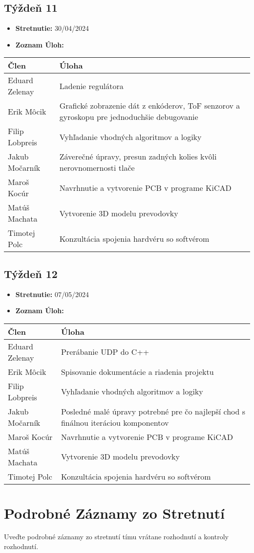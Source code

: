 \subsection{Týždeň 11}
\begin{itemize}
    \item \textbf{Stretnutie:} 30/04/2024
    \item \textbf{Zoznam Úloh:}
\end{itemize}

\begin{tabular}{|l|l|}
    \hline
    \textbf{Člen} & \textbf{Úloha} \\
    \hline
    Eduard Zelenay & Ladenie regulátora \\
    Erik Môcik & Grafické zobrazenie dát z enkóderov, ToF senzorov a gyroskopu pre jednoduchšie debugovanie \\
    Filip Lobpreis & Vyhľadanie vhodných algoritmov a logiky \\
    Jakub Močarník & Záverečné úpravy, presun zadných kolies kvôli nerovnomernosti tlače \\
    Maroš Kocúr & Navrhnutie a vytvorenie PCB v programe KiCAD \\
    Matúš Machata & Vytvorenie 3D modelu prevodovky \\
    Timotej Polc & Konzultácia spojenia hardvéru so softvérom \\
    \hline
\end{tabular}
\subsection{Týždeň 12}
\begin{itemize}
    \item \textbf{Stretnutie:} 07/05/2024
    \item \textbf{Zoznam Úloh:}
\end{itemize}

\begin{tabular}{|l|l|}
    \hline
    \textbf{Člen} & \textbf{Úloha} \\
    \hline
    Eduard Zelenay & Prerábanie UDP do C++ \\
    Erik Môcik & Spisovanie dokumentácie a riadenia projektu \\
    Filip Lobpreis & Vyhľadanie vhodných algoritmov a logiky \\
    Jakub Močarník & Posledné malé úpravy potrebné pre čo najlepší chod s finálnou iteráciou komponentov \\
    Maroš Kocúr & Navrhnutie a vytvorenie PCB v programe KiCAD \\
    Matúš Machata & Vytvorenie 3D modelu prevodovky \\
    Timotej Polc & Konzultácia spojenia hardvéru so softvérom \\
    \hline
\end{tabular}



\section{Podrobné Záznamy zo Stretnutí}

Uveďte podrobné záznamy zo stretnutí tímu vrátane rozhodnutí a kontroly rozhodnutí.